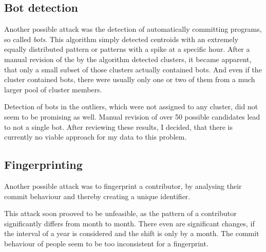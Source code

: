 \subsection{Bot detection}
Another possible attack was the detection of automatically committing programs, so called \emph{bots}.
This algorithm simply detected centroids with an extremely equally distributed pattern or patterns with a spike at a specific hour.
After a manual revision of the by the algorithm detected clusters, it became apparent, that only a small subset of those clusters actually contained bots.
And even if the cluster contained bots, there were usually only one or two of them from a much larger pool of cluster members.

Detection of bots in the outliers, which were not assigned to any cluster, did not seem to be promising as well.
Manual revision of over 50 possible candidates lead to not a single bot.
After reviewing these results, I decided, that there is currently no viable approach for my data to this problem.


\subsection{Fingerprinting}
Another possible attack was to fingerprint a contributor, by analysing their commit behaviour and thereby creating a unique identifier.

This attack soon prooved to be unfeasible, as the pattern of a contributor significantly differs from month to month.
There even are significant changes, if the interval of a year is considered and the shift is only by a month.
The commit behaviour of people seem to be too inconsistent for a fingerprint.
